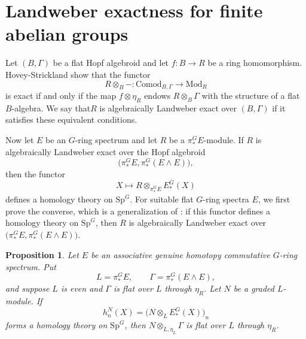\documentclass[11pt,reqno]{amsart}
\newtheorem{proposition}[proposition]{Proposition}
\newcommand{\Sp}{\mathrm{Sp}}
\newcommand{\Mod}{\mathrm{Mod}}
\newcommand{\Comod}{\mathrm{Comod}}
\newcommand{\tensor}{\otimes}
\begin{document}
\section{Landweber exactness for finite abelian groups}\label{sec:finite}

Let $(B,\Gamma)$ be a flat Hopf algebroid and let $f\colon B\to R$ be a ring homomorphism. Hovey-Strickland \cite[Lemma 2.2]{hovey2005comodules} show that the functor
\[
R\otimes_B -\colon \Comod_{B,\Gamma}\longrightarrow \Mod_R
\]
is exact if and only if the map $f\otimes \eta_R$ endows $R\otimes_B\Gamma$ with the structure of a flat $B$-algebra. We say that$R$ is algebraically Landweber exact over $(B,\Gamma)$ if it satisfies these equivalent conditions.

Now let $E$ be an $G$-ring spectrum and let $R$ be a $\pi_*^G E$-module. If $R$ is algebraically Landweber exact over the Hopf algebroid
\[
\bigl(\pi_*^G E,\pi_*^G(E\wedge E)\bigr),
\]
then the functor
\[
X\longmapsto
R\otimes_{\pi_*^G E}E_*^G(X)
\]
defines a homology theory on $\Sp^G$. For suitable flat $G$-ring spectra $E$, we first prove the converse, which is a generalization of \cite{rudyak1986exactness}: if this functor defines a homology theory on $\Sp^G$, then $R$ is algebraically Landweber exact over $\bigl(\pi_*^G E,\pi_*^G(E\wedge E)\bigr)$.




\begin{proposition}\label{prop:homology-implies-flat}
Let $E$ be an associative genuine homotopy commutative $G$-ring spectrum. Put
\[
  L=\pi_*^GE, \qquad \Gamma=\pi_*^G(E\wedge E),
\]
and suppose $L$ is even and $\Gamma$ is flat over $L$ through $\eta_R$. Let $N$ be a graded $L$-module.  If
\[
  h_n^N(X)=\bigl(N\tensor_LE_*^G(X)\bigr)_n
\]
forms a homology theory on $\Sp^G$, then $N\tensor_{L,\eta_L}\Gamma$ is flat over $L$ through $\eta_R$.
\end{proposition}
\end{document}
